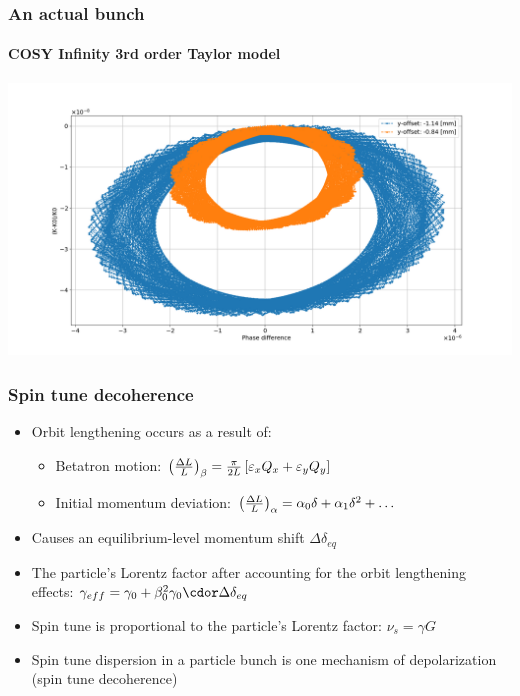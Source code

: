 \documentclass{beamer}
\begin{document}
\begin{frame}\frametitle{An actual bunch} \framesubtitle{COSY Infinity 3rd order Taylor model}
  \centering
  \includegraphics[width=\linewidth]{psp_diagram_betatron}
\end{frame}

\begin{frame}\frametitle{Spin tune decoherence}
  \begin{itemize}
  \item Orbit lengthening occurs as a result of:
    \begin{itemize}
    \item Betatron motion: $\bkt{\frac{\Delta L}{L}}_\beta = \frac{\pi}{2L}\bkt*{\varepsilon_xQ_x + \varepsilon_yQ_y}$
    \item Initial momentum deviation: $\bkt{\frac{\Delta L}{L}}_\alpha = \alpha_0\delta + \alpha_1\delta^2 + \dots$
    \end{itemize}
  \item Causes an equilibrium-level momentum shift $\Delta\delta_{eq}$
  \item The particle's Lorentz factor after accounting for the orbit lengthening effects: $\gamma_{eff} = \gamma_0 + \beta_0^2\gamma_0\cdor \Delta\delta_{eq}$
  \item Spin tune is proportional to the particle's Lorentz factor: $\nu_s = \gamma G$
  \item Spin tune dispersion in a particle bunch is one mechanism of depolarization (spin tune decoherence)
  \end{itemize}
\end{frame}
\end{document}
